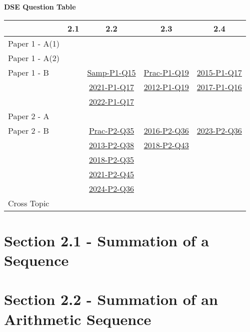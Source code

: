 \documentclass[12pt, a4paper]{article}
\begin{document}
\begin{absolutelynopagebreak}
\begin{center}
\textbf{DSE Question Table}
\end{center}
\begin{center}
\begin{tabular}{|l|c|c|c|c|}
\hline
        & 2.1 & 2.2 & 2.3 & 2.4 \\\hline
\hline
Paper 1 - A(1)&  &  &  &  \\
\hline
Paper 1 - A(2)&  &  &  &  \\
\hline
Paper 1 - B&  & \hyperref[DSE2012S-CoreP1-Q15]{Samp-P1-Q15} & \hyperref[DSE2012P-CoreP1-Q19]{Prac-P1-Q19} & \hyperref[DSE2015-CoreP1-Q17]{2015-P1-Q17} \\
&  & \hyperref[DSE2021-CoreP1-Q17]{2021-P1-Q17} & \hyperref[DSE2012-CoreP1-Q19]{2012-P1-Q19} & \hyperref[DSE2017-CoreP1-Q16]{2017-P1-Q16} \\
&  & \hyperref[DSE2022-CoreP1-Q17]{2022-P1-Q17} &  &  \\
\hline
\hline
Paper 2 - A&  &  &  &  \\
\hline
Paper 2 - B&  & \hyperref[DSE2012P-CoreP2-Q35]{Prac-P2-Q35} & \hyperref[DSE2016-CoreP2-Q36]{2016-P2-Q36} & \hyperref[DSE2023-CoreP2-Q36]{2023-P2-Q36} \\
&  & \hyperref[DSE2013-CoreP2-Q38]{2013-P2-Q38} & \hyperref[DSE2018-CoreP2-Q43]{2018-P2-Q43} &  \\
&  & \hyperref[DSE2018-CoreP2-Q35]{2018-P2-Q35} &  &  \\
&  & \hyperref[DSE2021-CoreP2-Q45]{2021-P2-Q45} &  &  \\
&  & \hyperref[DSE2024-CoreP2-Q36]{2024-P2-Q36} &  &  \\
\hline
\hline
Cross Topic&  &  &  &  \\
\hline
\end{tabular}
\end{center}
\end{absolutelynopagebreak}




\section*{Section 2.1 - Summation of a Sequence \NF}\label{section:6-2-1}





\section*{Section 2.2 - Summation of an Arithmetic Sequence \NF}\label{section:6-2-2}
\end{document}
